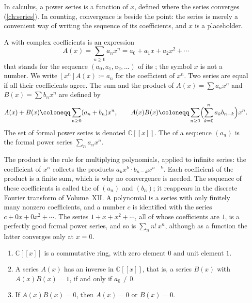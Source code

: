 In calculus, a power series is a function of $x$, defined where the series converges (\cref{ch:series}). In counting, convergence is beside the point: the series is merely a convenient way of writing the sequence of its coefficients, and $x$ is a placeholder.

\begin{definition}
\label{def:fps}
A  with complex coefficients is an expression
\[
A(x)=\sum_{n\ge0}a_nx^n=a_0+a_1x+a_2x^2+\cdots
\]
that stands for the sequence $(a_0,a_1,a_2,\ldots)$ of its ; the symbol $x$ is not a number. We write $[x^n]A(x)\coloneqq a_n$ for the coefficient of $x^n$. Two series are equal if all their coefficients agree. The sum and the product of $A(x)=\sum a_nx^n$ and $B(x)=\sum b_nx^n$ are defined by
\[
A(x)+B(x)\coloneqq\sum_{n\ge0}(a_n+b_n)x^n,\qquad A(x)B(x)\coloneqq\sum_{n\ge0}\Bigl(\sum_{k=0}^{n}a_kb_{n-k}\Bigr)x^n .
\]
The set of formal power series is denoted $\mathbb C[[x]]$. The  of a sequence $(a_n)$ is the formal power series $\sum_na_nx^n$.
\end{definition}

The product is the rule for multiplying polynomials, applied to infinite series: the coefficient of $x^n$ collects the products $a_kx^k\cdot b_{n-k}x^{n-k}$. Each coefficient of the product is a finite sum, which is why no convergence is needed. The sequence of these coefficients is called the  of $(a_n)$ and $(b_n)$; it reappears in the discrete Fourier transform of Volume~XII. A polynomial is a series with only finitely many nonzero coefficients, and a number $c$ is identified with the series $c+0x+0x^2+\cdots$. The series $1+x+x^2+\cdots$, all of whose coefficients are $1$, is a perfectly good formal power series, and so is $\sum_nn!\,x^n$, although as a function the latter converges only at $x=0$.

\begin{proposition}
\label{prop:fps-ring}
\leavevmode
\begin{enumerate}
\item $\mathbb C[[x]]$ is a commutative ring, with zero element $0$ and unit element $1$.
\item A series $A(x)$ has an inverse in $\mathbb C[[x]]$, that is, a series $B(x)$ with $A(x)B(x)=1$, if and only if $a_0\ne0$.
\item If $A(x)B(x)=0$, then $A(x)=0$ or $B(x)=0$.
\end{enumerate}
\end{proposition}

